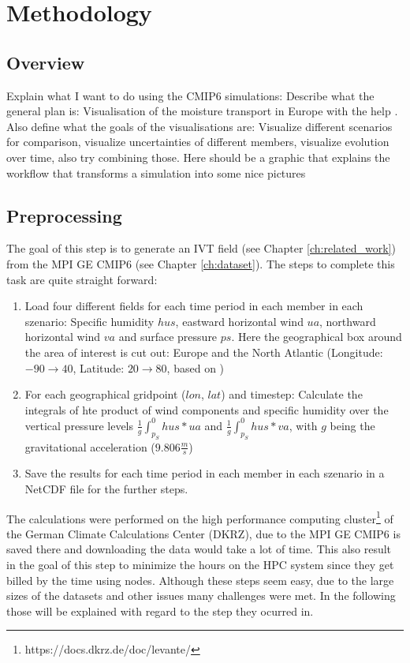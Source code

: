 \chapter{Methodology}
\label{ch:methodology}

\section{Overview}

Explain what I want to do using the CMIP6 simulations: Describe what the general plan is: Visualisation of the moisture transport in Europe with the help . 
Also define what the goals of the visualisations are: Visualize different scenarios for comparison, visualize uncertainties of different members, visualize evolution over time, also try combining those. 
Here should be a graphic that explains the workflow that transforms a simulation into some nice pictures


\section{Preprocessing}

The goal of this step is to generate an IVT field (see Chapter \ref{ch:related_work}) from the MPI GE CMIP6 (see Chapter \ref{ch:dataset}). 
The steps to complete this task are quite straight forward:

\begin{enumerate}
  \item Load four different fields for each time period in each member in each szenario: Specific humidity $hus$, eastward horizontal wind $ua$, northward horizontal wind $va$ and surface pressure $ps$. Here the geographical box around the area of interest is cut out: Europe and the North Atlantic (Longitude: $-90 \to 40$, Latitude: $20 \to 80$, based on \cite{vietinghoff_visual_2021})
  \item For each geographical gridpoint ($lon$, $lat$) and timestep: Calculate the integrals of hte product of wind components and specific humidity over the vertical pressure levels $\frac{1}{g}\int_{p_S}^0 hus * ua$ and  $\frac{1}{g}\int_{p_S}^0 hus * va$, with $g$ being the gravitational acceleration ($9.806 \frac{m}{s}$) 
  \item Save the results for each time period in each member in each szenario in a NetCDF file for the further steps. 
  
\end{enumerate}

The calculations were performed on the high performance computing cluster\footnote{https://docs.dkrz.de/doc/levante/} of the German Climate Calculations Center (DKRZ), due to the MPI GE CMIP6 is saved there and downloading the data would take a lot of time. 
This also result in the goal of this step to minimize the hours on the HPC system since they get billed by the time using nodes. 
Although these steps seem easy, due to the large sizes of the datasets and other issues many challenges were met. 
In the following those will be explained with regard to the step they ocurred in. 




